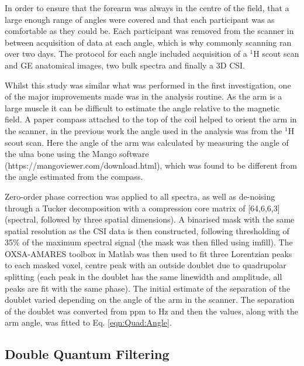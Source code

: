 In order to ensure that the forearm was always in the centre of the field, that a large enough range of angles were covered and that each participant was as comfortable as they could be. Each participant was removed from the scanner in between acquisition of data at each angle, which is why commonly scanning ran over two days. The protocol for each angle included  acquisition of a $^1$H scout scan and \ac{GE} anatomical images, two bulk spectra and finally a 3D \ac{CSI}. 

Whilst this study was similar what was performed in the first investigation, one of the major improvements made was in the analysis routine. As the arm is a large muscle it can be difficult to estimate the angle relative to the magnetic field. A paper compass attached to the top of the coil helped to orient the arm in the scanner, in the previous work the angle used in the analysis was from the $^1$H scout scan. Here the angle of the arm was calculated by measuring the angle of the ulna bone using the Mango software (https://mangoviewer.com/download.html), which was found to be different from the angle estimated from the compass.

Zero-order phase correction was applied to all spectra, as well as de-noising through a Tucker decomposition \cite{Bader2007EfficientTensors} with a compression core matrix of [64,6,6,3] (spectral, followed by three spatial dimensions). A binarised mask with the same spatial resolution as the \ac{CSI} data is then constructed, following thresholding of 35\% of the maximum spectral signal (the mask was then filled using imfill). The OXSA-AMARES \cite{Purvis2017OXSA:MATLAB} toolbox in Matlab was then used to fit three Lorentzian peaks to each masked voxel, centre peak with an outside doublet due to quadrupolar splitting (each peak in the doublet has the same linewidth and amplitude, all peaks are fit with the same phase). The initial estimate of the separation of the doublet varied depending on the angle of the arm in the scanner. The separation of the doublet was converted from ppm to Hz and then the values, along with the arm angle, was fitted to Eq. \ref{eqn:Quad:Angle}.

\subsection{Double Quantum Filtering}

